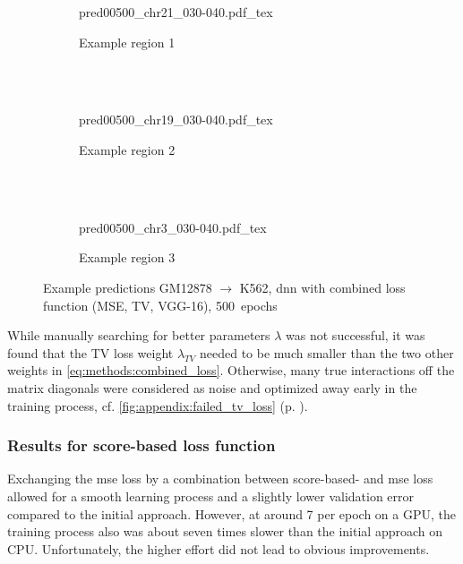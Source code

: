 \begin{figure}[p]
    \begin{subfigure}{\textwidth}
        \centering
        \scriptsize
        {pred00500_chr21_030-040.pdf_tex}
        \caption{Example  region 1} \label{fig:results:combiloss_r1}
    \end{subfigure}\\[2mm]
    \\[3mm]
    \begin{subfigure}{\textwidth}
        \centering
        \scriptsize
        {pred00500_chr19_030-040.pdf_tex}
        \caption{Example region 2} \label{fig:results:combiloss_r2}
    \end{subfigure}\\[2mm]
    \\[3mm]
    \begin{subfigure}{\textwidth}
        \centering
        \scriptsize
        {pred00500_chr3_030-040.pdf_tex}
        \caption{Example region 3} \label{fig:results:combiloss_r3}
    \end{subfigure}
    \caption{Example predictions GM12878 $\rightarrow$ K562, \acrshort{dnn} with combined loss function (MSE, TV, VGG-16), 500~epochs} \label{fig:results:combiloss_matrices}
\end{figure}

While manually searching for better parameters $\lambda$ was not successful,
it was found that the TV loss weight $\lambda_\mathit{TV}$ needed to be much smaller than the two other weights in \cref{eq:methods:combined_loss}.
Otherwise, many true interactions off the matrix diagonals were considered as noise and optimized away early in the training process, cf.
\cref{fig:appendix:failed_tv_loss} (p. \pageref{fig:appendix:failed_tv_loss}).

\subsubsection{Results for score-based loss function} \label{sec:results:scorebased}
Exchanging the \acrshort{mse} loss by a combination between score-based- and \acrshort{mse} loss
allowed for a smooth learning process and a slightly lower validation error compared to the initial approach.
However, at around \SI{7}{\min} per epoch on a GPU, the training process also was about seven times slower than the initial approach on CPU.
Unfortunately, the higher effort did not lead to obvious improvements.

